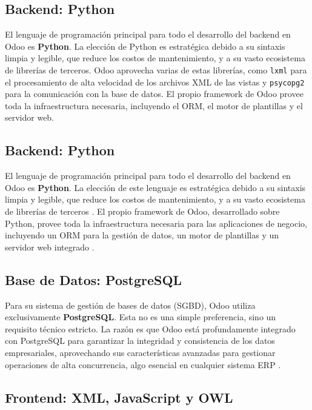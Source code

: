 \documentclass[12pt,letterpaper,spanish]{report}
\begin{document}
\subsection{Backend: Python}
El lenguaje de programación principal para todo el desarrollo del backend en Odoo es \textbf{Python}. La elección de Python es estratégica debido a su sintaxis limpia y legible, que reduce los costos de mantenimiento, y a su vasto ecosistema de librerías de terceros. Odoo aprovecha varias de estas librerías, como \texttt{lxml} para el procesamiento de alta velocidad de los archivos XML de las vistas y \texttt{psycopg2} para la comunicación con la base de datos. El propio framework de Odoo provee toda la infraestructura necesaria, incluyendo el ORM, el motor de plantillas y el servidor web.

\subsection{Backend: Python}

El lenguaje de programación principal para todo el desarrollo del backend en Odoo es \textbf{Python}. La elección de este lenguaje es estratégica debido a su sintaxis limpia y legible, que reduce los costos de mantenimiento, y a su vasto ecosistema de librerías de terceros \cite{pythonDocs}. El propio framework de Odoo, desarrollado sobre Python, provee toda la infraestructura necesaria para las aplicaciones de negocio, incluyendo un ORM para la gestión de datos, un motor de plantillas y un servidor web integrado \cite{pretell2024mejora}.

\subsection{Base de Datos: PostgreSQL}

Para su sistema de gestión de bases de datos (SGBD), Odoo utiliza exclusivamente \textbf{PostgreSQL}. Esta no es una simple preferencia, sino un requisito técnico estricto. La razón es que Odoo está profundamente integrado con PostgreSQL para garantizar la integridad y consistencia de los datos empresariales, aprovechando sus características avanzadas para gestionar operaciones de alta concurrencia, algo esencial en cualquier sistema ERP \cite{postgresqlDocs}.

\subsection{Frontend: XML, JavaScript y OWL}
\end{document}
